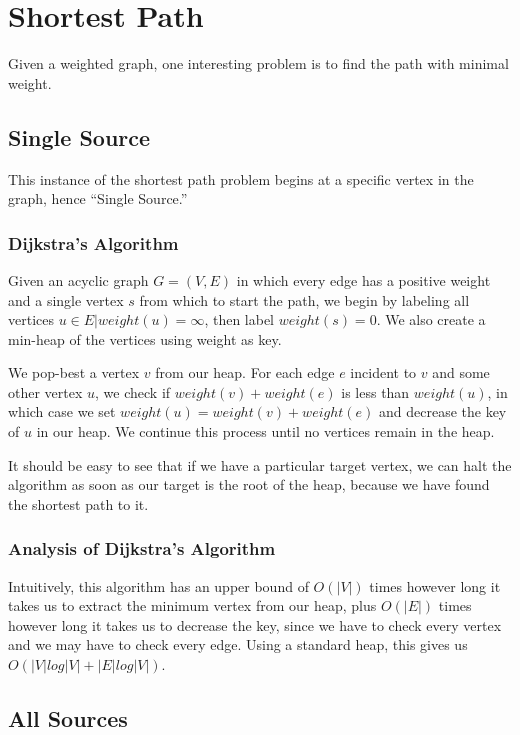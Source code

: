 \chapter{Shortest Path}

Given a weighted graph, one interesting problem is to find the
path with minimal weight.

\section{Single Source}

This instance of the shortest path problem begins at a specific vertex
in the graph, hence ``Single Source.''

\subsection{Dijkstra's Algorithm}

Given an acyclic graph $G=(V,E)$ in which every edge has a positive
weight and a single vertex $s$ from which to start the path, we begin
by labeling all vertices $u \in E | weight(u) = \infty$, then label
$weight(s) = 0$.  We also create a min-heap of the vertices using
weight as key.

We pop-best a vertex $v$ from our heap.  For each edge $e$ incident to
$v$ and some other vertex $u$, we check if $weight(v) + weight(e)$ is
less than $weight(u)$, in which case we set $weight(u) = weight(v) +
weight(e)$ and decrease the key of $u$ in our heap.  We continue this
process until no vertices remain in the heap.

It should be easy to see that if we have a particular target vertex,
we can halt the algorithm as soon as our target is the root of the
heap, because we have found the shortest path to it.

\subsection{Analysis of Dijkstra's Algorithm}

Intuitively, this algorithm has an upper bound of $O(|V|)$ times
however long it takes us to extract the minimum vertex from our heap,
plus $O(|E|)$ times however long it takes us to decrease the key,
since we have to check every vertex and we may have to check every
edge.  Using a standard heap, this gives us $O(|V|log|V| +
|E|log|V|)$.

\section{All Sources}


